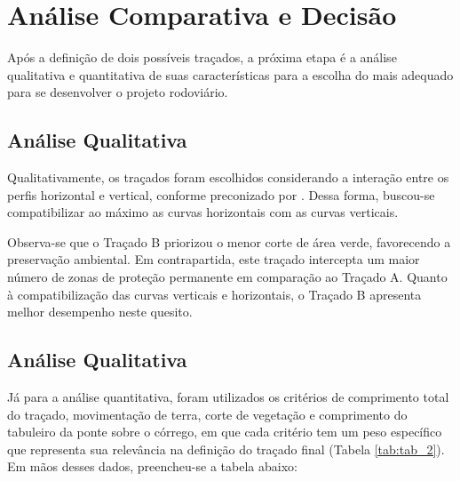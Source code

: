 \chapter{Análise Comparativa e Decisão}


Após a definição de dois possíveis traçados, a próxima etapa é a análise qualitativa 
e quantitativa de suas características para a escolha do mais adequado para se desenvolver 
o projeto rodoviário.  


\section{Análise Qualitativa}

Qualitativamente, os traçados foram escolhidos considerando a interação entre os perfis horizontal e vertical, conforme preconizado por \cite{lee2003}. Dessa forma, buscou-se compatibilizar ao máximo as curvas horizontais com as curvas verticais.

Observa-se que o Traçado B priorizou o menor corte de área verde, favorecendo a preservação ambiental. Em contrapartida, este traçado intercepta um maior número de zonas de proteção permanente em comparação ao Traçado A. Quanto à compatibilização das curvas verticais e horizontais, o Traçado B apresenta melhor desempenho neste quesito.



\section{Análise Qualitativa}

Já para a análise quantitativa, foram utilizados os critérios de comprimento 
total do traçado, movimentação de terra, corte de vegetação e comprimento do 
tabuleiro da ponte sobre o córrego, em que cada critério tem um peso específico 
que representa sua relevância na definição do traçado final (Tabela \ref{tab:tab_2}). Em mãos 
desses dados, preencheu-se a tabela abaixo: 



